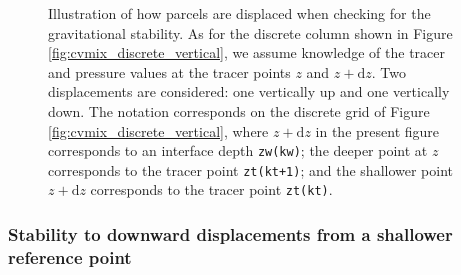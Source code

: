 \begin{figure}
\begin{center}
\caption[Parcel displacements for gravitational stability calculation]
{Illustration of how parcels are displaced when checking for the
  gravitational stability. As for the discrete column shown in Figure
  \ref{fig:cvmix_discrete_vertical}, we assume knowledge of the tracer
  and pressure values at the tracer points $z$ and
  $z+\mathrm{d}z$. Two displacements are considered: one vertically up
  and one vertically down.  The notation corresponds on the discrete
  grid of Figure \ref{fig:cvmix_discrete_vertical}, where
  $z+\mathrm{d}z$ in the present figure corresponds to an interface
  depth {\tt zw(kw)}; the deeper point at $z$ corresponds to the
  tracer point {\tt zt(kt+1)}; and the shallower point $z+\mathrm{d}z$
  corresponds to the tracer point {\tt zt(kt)}.}
\label{fig:cvmix_stability}
\end{center}
\end{figure}


\subsubsection{Stability to downward displacements from a shallower reference point}

